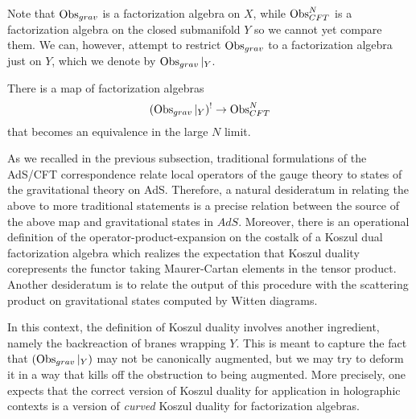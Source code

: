 Note that $\operatorname{Obs}_{grav}$ is a factorization algebra on $X$, while $\operatorname{Obs}_{CFT}^N$ is a factorization algebra on the closed submanifold $Y$ so we cannot yet compare them.
We can, however, attempt to restrict $\operatorname{Obs}_{grav}$ to a factorization algebra just on $Y$, which we denote by $\operatorname{Obs}_{grav}|_Y$.

\begin{expect}\label{twistedholog}
There is a map of factorization algebras
\[
  (\operatorname{Obs}_{grav}|_{Y})^{!}\to \operatorname{Obs}_{CFT}^N
\]
that becomes an equivalence in the large $N$ limit.
\end{expect}

As we recalled in the previous subsection, traditional formulations of the AdS/CFT correspondence relate local operators of the gauge theory to states of the gravitational theory on AdS. Therefore, a natural desideratum in relating the above to more traditional statements is a precise relation between the source of the above map and gravitational states in $AdS$. Moreover, there is an operational definition of the operator-product-expansion on the costalk of a Koszul dual factorization algebra which realizes the expectation that Koszul duality corepresents the functor taking Maurer-Cartan elements in the tensor product. Another desideratum is to relate the output of this procedure with the scattering product on gravitational states computed by Witten diagrams. 

\begin{rmk}
In this context, the definition of Koszul duality involves another ingredient, namely the backreaction of branes wrapping $Y$. This is meant to capture the fact that $(\operatorname{Obs}_{grav}|_Y)$ may not be canonically augmented, but we may try to deform it in a way that kills off the obstruction to being augmented. More precisely, one expects that the correct version of Koszul duality for application in holographic contexts is a version of \textit{curved} Koszul duality for factorization algebras. 
\end{rmk}

